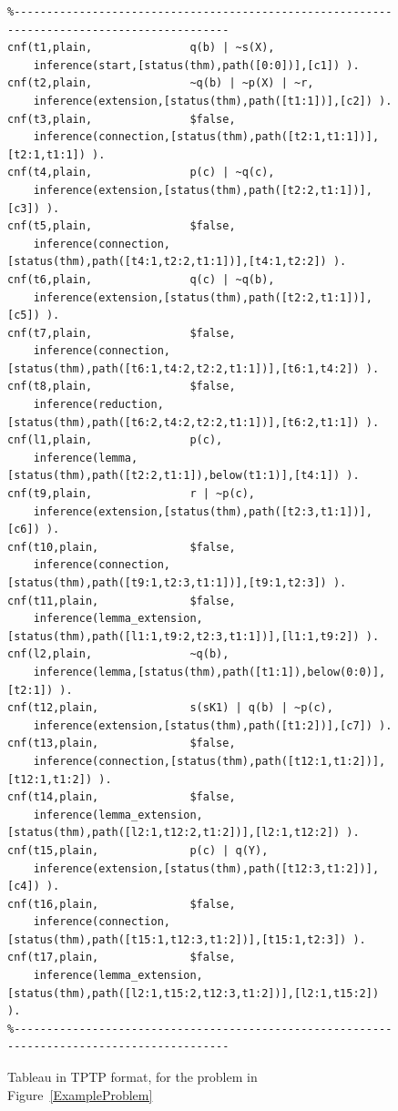 \documentclass[runningheads]{llncs}
\begin{document}
{\begin{figure}[htb]
\centering
{\scriptsize
{\setlength{\baselineskip}{3mm}
\begin{verbatim}
%--------------------------------------------------------------------------------------------
cnf(t1,plain,               q(b) | ~s(X),
    inference(start,[status(thm),path([0:0])],[c1]) ).
cnf(t2,plain,               ~q(b) | ~p(X) | ~r,
    inference(extension,[status(thm),path([t1:1])],[c2]) ).
cnf(t3,plain,               $false,
    inference(connection,[status(thm),path([t2:1,t1:1])],[t2:1,t1:1]) ).
cnf(t4,plain,               p(c) | ~q(c),
    inference(extension,[status(thm),path([t2:2,t1:1])],[c3]) ).
cnf(t5,plain,               $false,
    inference(connection,[status(thm),path([t4:1,t2:2,t1:1])],[t4:1,t2:2]) ).
cnf(t6,plain,               q(c) | ~q(b),
    inference(extension,[status(thm),path([t2:2,t1:1])],[c5]) ).
cnf(t7,plain,               $false,
    inference(connection,[status(thm),path([t6:1,t4:2,t2:2,t1:1])],[t6:1,t4:2]) ).
cnf(t8,plain,               $false,
    inference(reduction,[status(thm),path([t6:2,t4:2,t2:2,t1:1])],[t6:2,t1:1]) ).
cnf(l1,plain,               p(c),
    inference(lemma,[status(thm),path([t2:2,t1:1]),below(t1:1)],[t4:1]) ).
cnf(t9,plain,               r | ~p(c),
    inference(extension,[status(thm),path([t2:3,t1:1])],[c6]) ).
cnf(t10,plain,              $false,
    inference(connection,[status(thm),path([t9:1,t2:3,t1:1])],[t9:1,t2:3]) ).
cnf(t11,plain,              $false,
    inference(lemma_extension,[status(thm),path([l1:1,t9:2,t2:3,t1:1])],[l1:1,t9:2]) ).
cnf(l2,plain,               ~q(b),
    inference(lemma,[status(thm),path([t1:1]),below(0:0)],[t2:1]) ).
cnf(t12,plain,              s(sK1) | q(b) | ~p(c),
    inference(extension,[status(thm),path([t1:2])],[c7]) ).
cnf(t13,plain,              $false,
    inference(connection,[status(thm),path([t12:1,t1:2])],[t12:1,t1:2]) ).
cnf(t14,plain,              $false,
    inference(lemma_extension,[status(thm),path([l2:1,t12:2,t1:2])],[l2:1,t12:2]) ).
cnf(t15,plain,              p(c) | q(Y),
    inference(extension,[status(thm),path([t12:3,t1:2])],[c4]) ).
cnf(t16,plain,              $false,
    inference(connection,[status(thm),path([t15:1,t12:3,t1:2])],[t15:1,t2:3]) ).
cnf(t17,plain,              $false,
    inference(lemma_extension,[status(thm),path([l2:1,t15:2,t12:3,t1:2])],[l2:1,t15:2]) ).
%--------------------------------------------------------------------------------------------
\end{verbatim}
}}
\caption{Tableau in TPTP format, for the problem in Figure~\ref{ExampleProblem}}
\label{ExampleTableau}
\end{figure}

}
\end{document}
